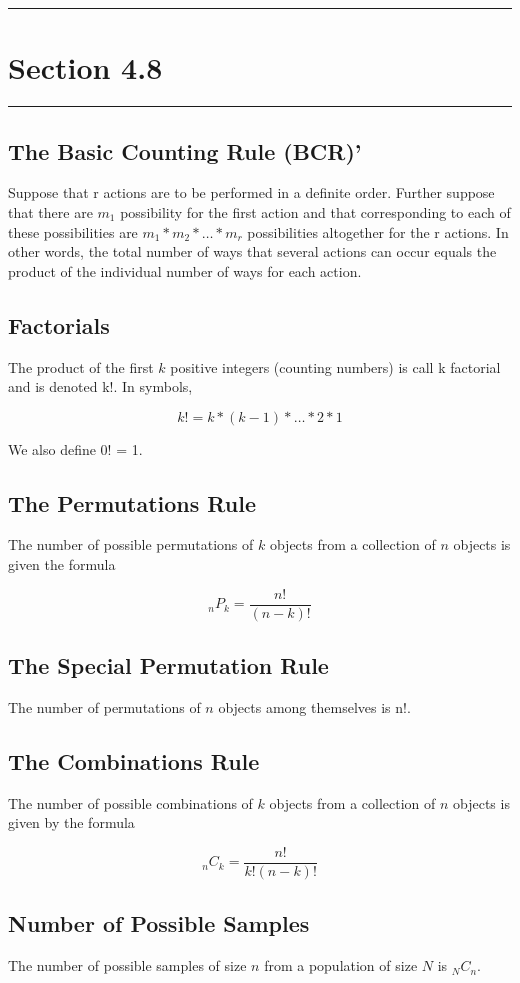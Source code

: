 \documentclass[12pt]{article}
\begin{document}
    \noindent\rule{\textwidth}{0.4pt}
    \section*{Section 4.8}
    \noindent\rule{\textwidth}{0.4pt}
        \subsection*{The Basic Counting Rule (BCR)'}
            Suppose that r actions are to be performed in a definite order. Further suppose that
            there are $m_1$ possibility for the first action and that corresponding to each of
            these possibilities are $m_1 * m_2 * \dots * m_r$ possibilities altogether for the r
            actions. In other words, the total
            number of ways that several actions can occur equals the product of the individual 
            number of ways for each action.
        \subsection*{Factorials}
            The product of the first $k$ positive integers (counting numbers) is call k factorial
            and is denoted k!. In symbols,
            \begin{center}
                \[
                    k! = k * (k-1) * \dots * 2 * 1
                \]
            \end{center}
            We also define 0! = 1.
        \subsection*{The Permutations Rule}
            The number of possible permutations of $k$ objects from a collection of $n$ objects 
            is given the formula
            \begin{center}
                \[
                    _nP_k = \frac{n!}{(n-k)!}
                \]
            \end{center}
        \subsection*{The Special Permutation Rule}
            The number of permutations of $n$ objects among themselves is n!.
        \subsection*{The Combinations Rule}
            The number of possible combinations of $k$ objects from a collection of $n$ objects 
            is given by the formula
            \begin{center}
                \[
                    _nC_k = \frac{n!}{k!(n-k)!}    
                \]                
            \end{center}
        \subsection*{Number of Possible Samples}
            The number of possible samples of size $n$ from a population of size $N$ is $_NC_n$.
\end{document}
